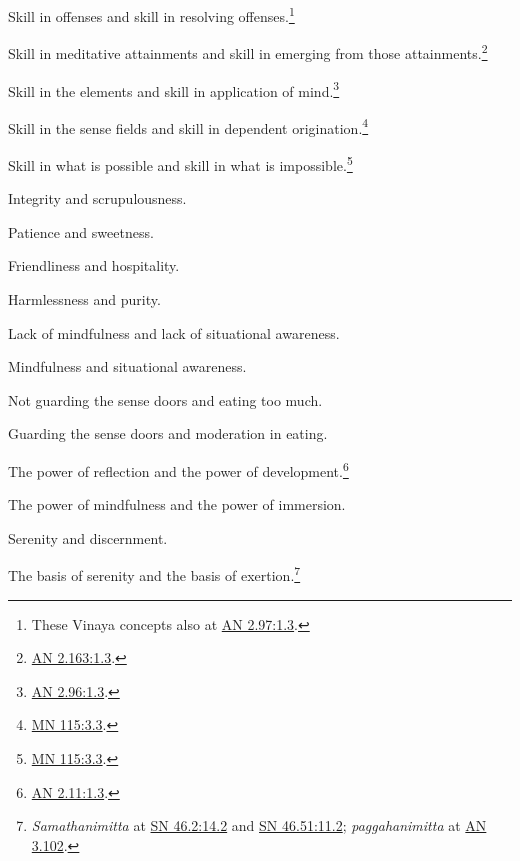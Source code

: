 \documentclass[12pt,openany]{book}%
\begin{document}
Skill in offenses and skill in resolving offenses.\footnote{These Vinaya concepts also at \href{https://suttacentral.net/an2.97/en/sujato\#1.3}{AN 2.97:1.3}. } 

Skill in meditative attainments and skill in emerging from those attainments.\footnote{\href{https://suttacentral.net/an2.163/en/sujato\#1.3}{AN 2.163:1.3}. } 

Skill in the elements and skill in application of mind.\footnote{\href{https://suttacentral.net/an2.96/en/sujato\#1.3}{AN 2.96:1.3}. } 

Skill in the sense fields and skill in dependent origination.\footnote{\href{https://suttacentral.net/mn115/en/sujato\#3.3}{MN 115:3.3}. } 

Skill in what is possible and skill in what is impossible.\footnote{\href{https://suttacentral.net/mn115/en/sujato\#3.3}{MN 115:3.3}. } 

Integrity and scrupulousness. 

Patience and sweetness. 

Friendliness and hospitality. 

Harmlessness and purity. 

Lack of mindfulness and lack of situational awareness. 

Mindfulness and situational awareness. 

Not guarding the sense doors and eating too much. 

Guarding the sense doors and moderation in eating. 

The power of reflection and the power of development.\footnote{\href{https://suttacentral.net/an2.11/en/sujato\#1.3}{AN 2.11:1.3}. } 

The power of mindfulness and the power of immersion. 

Serenity and discernment. 

The basis of serenity and the basis of exertion.\footnote{\textit{Samathanimitta} at \href{https://suttacentral.net/sn46.2/en/sujato\#14.2}{SN 46.2:14.2} and \href{https://suttacentral.net/sn46.51/en/sujato\#11.2}{SN 46.51:11.2}; \textit{paggahanimitta} at \href{https://suttacentral.net/an3.102/en/sujato}{AN 3.102}. } 
\end{document}
